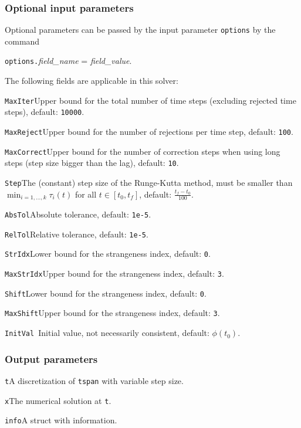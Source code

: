 \documentclass[final,reqno]{siamltex}
\renewenvironment{itemize}[1]{\begin{compactitem}#1}{\end{compactitem}}
\begin{document}
\subsubsection{Optional input parameters}
Optional parameters can be passed by the input parameter {\tt options} by the command 
\begin{center}
{\tt options.}{\it field\_name} = {\it field\_value}.
\end{center}
The following fields are applicable in this solver:
\begin{itemize}
\item {\tt MaxIter}\quad        Upper bound for the total number of time steps (excluding 
	rejected time steps), default: {\tt 10000}.
\item {\tt MaxReject}\quad      Upper bound for the number of rejections per time step, default: {\tt 100}.
\item{\tt MaxCorrect}\quad  Upper bound for the number of correction steps when using
         long steps (step size bigger than the lag), default: {\tt10}.
\item {\tt Step}\quad        The (constant) step size of the Runge-Kutta method, must be smaller than
          $\min_{i=1,\ldots,k}\tau_i(t)$ for all $t\in[t_0,t_f]$, default: $\frac{t_f-t_0}{100}$.
\item {\tt AbsTol}\quad       Absolute tolerance, default:  {\tt 1e-5}.
\item {\tt RelTol}\quad       Relative tolerance, default:  {\tt 1e-5}.
\item {\tt StrIdx}\quad       Lower bound for the strangeness index,  default: {\tt 0}.
\item {\tt MaxStrIdx}\quad    Upper bound for the strangeness index,  default: {\tt 3}.
\item {\tt Shift}\quad       Lower bound for the strangeness index,  default: {\tt 0}.
\item {\tt MaxShift}\quad    Upper bound for the strangeness index,  default: {\tt 3}.
\item {\tt InitVal  }\quad    Initial value, not necessarily consistent,  default: $\phi(t_0)$.
\end{itemize}

\subsubsection{Output parameters}
\begin{itemize}
\item {\tt t}\quad A discretization of {\tt tspan} with variable step size.
\item {\tt x}\quad The numerical solution at {\tt t}.
\item {\tt info}\quad A struct with information.
\end{itemize}
\end{document}
